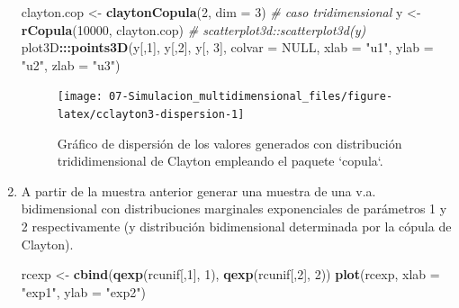 \documentclass[
]{book}
\newenvironment{Shaded}{\begin{snugshade}}{\end{snugshade}}
\newcommand{\CommentTok}[1]{\textcolor[rgb]{0.56,0.35,0.01}{\textit{#1}}}
\newcommand{\DataTypeTok}[1]{\textcolor[rgb]{0.13,0.29,0.53}{#1}}
\newcommand{\DecValTok}[1]{\textcolor[rgb]{0.00,0.00,0.81}{#1}}
\newcommand{\KeywordTok}[1]{\textcolor[rgb]{0.13,0.29,0.53}{\textbf{#1}}}
\newcommand{\NormalTok}[1]{#1}
\newcommand{\OperatorTok}[1]{\textcolor[rgb]{0.81,0.36,0.00}{\textbf{#1}}}
\newcommand{\OtherTok}[1]{\textcolor[rgb]{0.56,0.35,0.01}{#1}}
\newcommand{\StringTok}[1]{\textcolor[rgb]{0.31,0.60,0.02}{#1}}
\theoremstyle{break}
\theoremstyle{definition}
\theoremstyle{definition}
\theoremstyle{definition}
\theoremstyle{remark}
\begin{document}
\begin{enumerate}
\begin{Shaded}
\begin{Highlighting}[]
\NormalTok{clayton.cop <-}\StringTok{ }\KeywordTok{claytonCopula}\NormalTok{(}\DecValTok{2}\NormalTok{, }\DataTypeTok{dim =} \DecValTok{3}\NormalTok{) }\CommentTok{# caso tridimensional}
\NormalTok{y <-}\StringTok{ }\KeywordTok{rCopula}\NormalTok{(}\DecValTok{10000}\NormalTok{, clayton.cop)}
\CommentTok{# scatterplot3d::scatterplot3d(y)}
\NormalTok{plot3D}\OperatorTok{:::}\KeywordTok{points3D}\NormalTok{(y[,}\DecValTok{1}\NormalTok{], y[,}\DecValTok{2}\NormalTok{], y[, }\DecValTok{3}\NormalTok{], }\DataTypeTok{colvar =} \OtherTok{NULL}\NormalTok{, }
                  \DataTypeTok{xlab =} \StringTok{"u1"}\NormalTok{, }\DataTypeTok{ylab =} \StringTok{"u2"}\NormalTok{, }\DataTypeTok{zlab =} \StringTok{"u3"}\NormalTok{) }
\end{Highlighting}
\end{Shaded}

  \begin{figure}[!htb]

  {\centering \texttt{[image: 07-Simulacion\_multidimensional\_files/figure-latex/cclayton3-dispersion-1]} 

  }

  \caption{Gráfico de dispersión de los valores generados con distribución trididimensional de Clayton empleando el paquete `copula`.}\label{fig:cclayton3-dispersion}
  \end{figure}
\item
  A partir de la muestra anterior generar una muestra de una v.a.
  bidimensional con distribuciones marginales exponenciales de
  parámetros 1 y 2 respectivamente (y distribución bidimensional
  determinada por la cópula de Clayton).

\begin{Shaded}
\begin{Highlighting}[]
\NormalTok{rcexp <-}\StringTok{ }\KeywordTok{cbind}\NormalTok{(}\KeywordTok{qexp}\NormalTok{(rcunif[,}\DecValTok{1}\NormalTok{], }\DecValTok{1}\NormalTok{), }\KeywordTok{qexp}\NormalTok{(rcunif[,}\DecValTok{2}\NormalTok{], }\DecValTok{2}\NormalTok{))}
\KeywordTok{plot}\NormalTok{(rcexp, }\DataTypeTok{xlab =} \StringTok{"exp1"}\NormalTok{, }\DataTypeTok{ylab =} \StringTok{"exp2"}\NormalTok{)  }
\end{Highlighting}
\end{Shaded}

  \begin{figure}[!htb]


\end{figure}
\end{enumerate}
\end{document}
